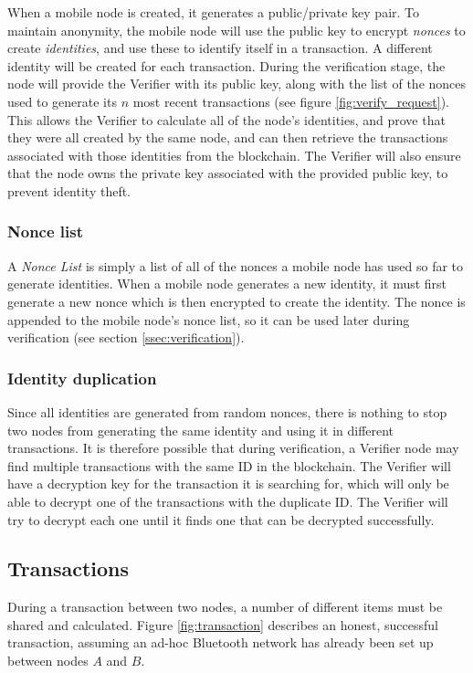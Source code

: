 \documentclass[12pt]{article}
\begin{document}
When a mobile node is created, it generates a public/private key pair. To maintain anonymity, the mobile node will use the public key to encrypt \textit{nonces} to create \textit{identities}, and use these to identify itself in a transaction. A different identity will be created for each transaction. During the verification stage, the node will provide the Verifier with its public key, along with the list of the nonces used to generate its $n$ most recent transactions (see figure \ref{fig:verify_request}). This allows the Verifier to calculate all of the node's identities, and prove that they were all created by the same node, and can then retrieve the transactions associated with those identities from the blockchain. The Verifier will also ensure that the node owns the private key associated with the provided public key, to prevent identity theft.

\subsubsection{Nonce list} \label{sssec:nonce_list}
A \textit{Nonce List} is simply a list of all of the nonces a mobile node has used so far to generate identities. When a mobile node generates a new identity, it must first generate a new nonce which is then encrypted to create the identity. The nonce is appended to the mobile node's nonce list, so it can be used later during verification (see section \ref{ssec:verification}).

\subsubsection{Identity duplication}
Since all identities are generated from random nonces, there is nothing to stop two nodes from generating the same identity and using it in different transactions. It is therefore possible that during verification, a Verifier node may find multiple transactions with the same ID in the blockchain. The Verifier will have a decryption key for the transaction it is searching for, which will only be able to decrypt one of the transactions with the duplicate ID. The Verifier will try to decrypt each one until it finds one that can be decrypted successfully.

\newpage
\subsection{Transactions} \label{sec:transactions}
During a transaction between two nodes, a number of different items must be shared and calculated. Figure \ref{fig:transaction} describes an honest, successful transaction, assuming an ad-hoc Bluetooth network has already been set up between nodes $A$ and $B$.
\end{document}
